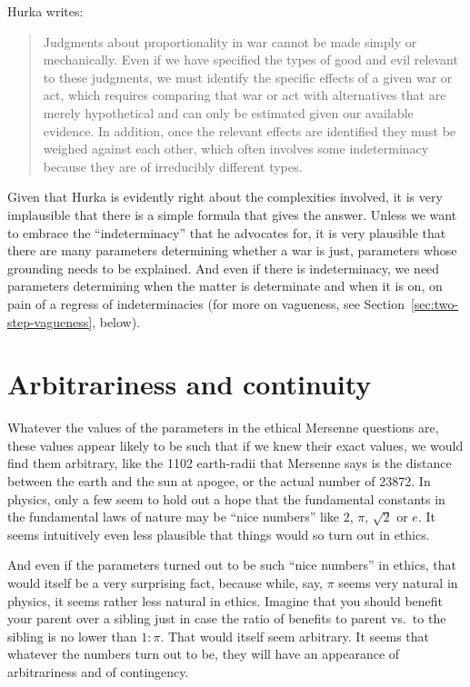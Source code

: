 Hurka writes:
\begin{quote}Judgments about proportionality in war cannot be made simply or
mechanically. Even if we have specified the types of good and evil relevant to these judgments, we must identify the specific effects of a given
war or act, which requires comparing that war or act with alternatives
that are merely hypothetical and can only be estimated given our available evidence. In addition, once the relevant effects are identified they
must be weighed against each other, which often involves some indeterminacy because they are of irreducibly different types. \parencite[p.~66]{Hurka2004}
\end{quote}
Given that Hurka is evidently right about the complexities involved, it is very implausible that there is a 
simple formula that gives the answer. Unless we want to embrace the ``indeterminacy'' that he advocates for,
it is very plausible that there are many parameters determining whether a war is just, parameters whose grounding 
needs to be explained. And even if there is indeterminacy, we need parameters determining when the matter is
determinate and when it is on, on pain of a regress of indeterminacies (for more on vagueness, see 
Section~\ref{sec:two-step-vagueness}, below).

\section{Arbitrariness and continuity}
Whatever the values of the parameters in the ethical Mersenne questions are, these values appear likely to be such 
that if we knew their exact values, we would find them arbitrary, like the 1102 earth-radii that Mersenne says
is the distance between the earth and the sun at apogee, or the actual number of 23872.
In physics, only a few seem to hold out a hope that the fundamental constants in the fundamental laws of nature may be ``nice numbers'' like
$2$, $\pi$, $\sqrt 2$ or $e$. It seems intuitively even less plausible that things would so turn out in ethics. 

And even if the parameters turned out to be such ``nice numbers'' in ethics, that would itself be a very surprising fact, because while, say,
$\pi$ seems very natural in physics, it seems rather less natural in ethics. Imagine that you should benefit your 
parent over a sibling just in case the ratio of benefits to parent vs.\ to the sibling is no lower than $1:\pi$. That would itself seem arbitrary.
It seems that whatever the numbers turn out to be, they will have an appearance of arbitrariness and of contingency.

